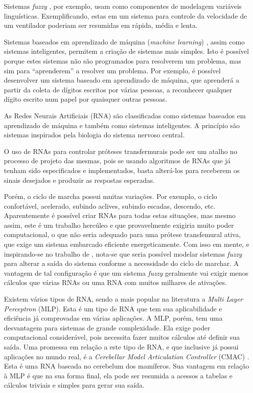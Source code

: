 Sistemas \emph{fuzzy} \cite{Lilly2010}, por exemplo, usam como componentes de modelagem variáveis linguísticas.
Exemplificando, estas em um sistema para controle da velocidade de um ventilador poderiam ser resumidas em rápida, média e lenta.

Sistemas baseados em aprendizado de máquina (\emph{machine learning}) \cite{Bishop2006a}, assim como sistemas inteligentes, permitem a criação de sistemas mais simples.
Isto é possível porque estes sistemas não são programados para resolverem um problema, mas sim para “aprenderem” a resolver um problema. 
Por exemplo, é possível desenvolver um sistema baseado em aprendizado de máquina, que aprenderá a partir da coleta de dígitos escritos por várias pessoas, a reconhecer qualquer dígito escrito num papel por quaisquer outras pessoas.

As Redes Neurais Artificiais (RNA) \cite{Haykin2009,Bishop2006a,Russel2010} são classificadas como sistemas baseados em aprendizado de máquina e também como sistemas inteligentes. 
A princípio são sistemas inspirados pela biologia do sistema nervoso central.

O uso de RNAs para controlar próteses transfermurais pode ser um atalho no processo de projeto das mesmas, pois se usando algoritmos de RNAs que já tenham sido especificados e implementados, basta alterá-los para receberem os sinais desejados e produzir as respostas esperadas. 

Porém, o ciclo de marcha possui muitas variações.
Por exemplo, o ciclo confortável, acelerado, subindo aclives, subindo escadas, descendo, etc. Aparentemente é possível criar RNAs para todas estas situações, mas mesmo assim, este é um trabalho hercúleo e que provavelmente exigiria muito poder computacional, o que não seria adequado para uma prótese transfemural ativa, que exige um sistema embarcado eficiente energeticamente.
Com isso em mente, e inspirando-se no trabalho de \cite{Sabourin2012}, nota-se que seria possível modelar sistemas \emph{fuzzy} para alterar a saída do sistema conforme a necessidade do ciclo de marchar.
A vantagem de tal configuração é que um sistema \emph{fuzzy} geralmente vai exigir menos cálculos que várias RNAs ou uma RNA com muitos milhares de ativações.

Existem vários tipos de RNA, sendo a mais popular na literatura a \emph{Multi Layer Perceptron} (MLP). 
Esta é um tipo de RNA que tem sua aplicabilidade e eficiência já comprovadas em várias aplicações.
A MLP, porém, tem uma desvantagem para sistemas de grande complexidade.
Ela exige poder computacional considerável, pois necessita fazer muitos cálculos até definir sua saída.
Uma promessa em relação a este tipo de RNA, e que inclusive já possui aplicações no mundo real, é a \emph{Cerebellar Model Articulation Controller} (CMAC) \cite{Albus1975a}.
Esta é uma RNA baseada no cerebelum dos mamíferos.
Sua vantagem em relação à MLP é que na sua forma final, ela pode ser resumida a acessos a tabelas e cálculos triviais e simples para gerar sua saída.

